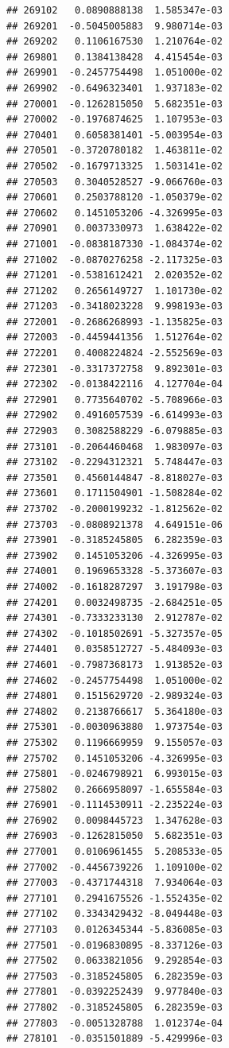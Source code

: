 \begin{frame}[fragile]
\begin{verbatim}
## 269102   0.0890888138  1.585347e-03
## 269201  -0.5045005883  9.980714e-03
## 269202   0.1106167530  1.210764e-02
## 269801   0.1384138428  4.415454e-03
## 269901  -0.2457754498  1.051000e-02
## 269902  -0.6496323401  1.937183e-02
## 270001  -0.1262815050  5.682351e-03
## 270002  -0.1976874625  1.107953e-03
## 270401   0.6058381401 -5.003954e-03
## 270501  -0.3720780182  1.463811e-02
## 270502  -0.1679713325  1.503141e-02
## 270503   0.3040528527 -9.066760e-03
## 270601   0.2503788120 -1.050379e-02
## 270602   0.1451053206 -4.326995e-03
## 270901   0.0037330973  1.638422e-02
## 271001  -0.0838187330 -1.084374e-02
## 271002  -0.0870276258 -2.117325e-03
## 271201  -0.5381612421  2.020352e-02
## 271202   0.2656149727  1.101730e-02
## 271203  -0.3418023228  9.998193e-03
## 272001  -0.2686268993 -1.135825e-03
## 272003  -0.4459441356  1.512764e-02
## 272201   0.4008224824 -2.552569e-03
## 272301  -0.3317372758  9.892301e-03
## 272302  -0.0138422116  4.127704e-04
## 272901   0.7735640702 -5.708966e-03
## 272902   0.4916057539 -6.614993e-03
## 272903   0.3082588229 -6.079885e-03
## 273101  -0.2064460468  1.983097e-03
## 273102  -0.2294312321  5.748447e-03
## 273501   0.4560144847 -8.818027e-03
## 273601   0.1711504901 -1.508284e-02
## 273702  -0.2000199232 -1.812562e-02
## 273703  -0.0808921378  4.649151e-06
## 273901  -0.3185245805  6.282359e-03
## 273902   0.1451053206 -4.326995e-03
## 274001   0.1969653328 -5.373607e-03
## 274002  -0.1618287297  3.191798e-03
## 274201   0.0032498735 -2.684251e-05
## 274301  -0.7333233130  2.912787e-02
## 274302  -0.1018502691 -5.327357e-05
## 274401   0.0358512727 -5.484093e-03
## 274601  -0.7987368173  1.913852e-03
## 274602  -0.2457754498  1.051000e-02
## 274801   0.1515629720 -2.989324e-03
## 274802   0.2138766617  5.364180e-03
## 275301  -0.0030963880  1.973754e-03
## 275302   0.1196669959  9.155057e-03
## 275702   0.1451053206 -4.326995e-03
## 275801  -0.0246798921  6.993015e-03
## 275802   0.2666958097 -1.655584e-03
## 276901  -0.1114530911 -2.235224e-03
## 276902   0.0098445723  1.347628e-03
## 276903  -0.1262815050  5.682351e-03
## 277001   0.0106961455  5.208533e-05
## 277002  -0.4456739226  1.109100e-02
## 277003  -0.4371744318  7.934064e-03
## 277101   0.2941675526 -1.552435e-02
## 277102   0.3343429432 -8.049448e-03
## 277103   0.0126345344 -5.836085e-03
## 277501  -0.0196830895 -8.337126e-03
## 277502   0.0633821056  9.292854e-03
## 277503  -0.3185245805  6.282359e-03
## 277801  -0.0392252439  9.977840e-03
## 277802  -0.3185245805  6.282359e-03
## 277803  -0.0051328788  1.012374e-04
## 278101  -0.0351501889 -5.429996e-03

\end{verbatim}
\end{frame}
